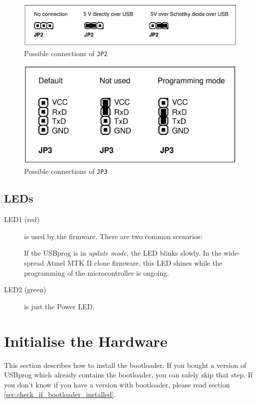 \documentclass[bibtotoc,UKenglish,halfparskip,oneside,DIV12]{scrreprt}
\begin{document}
\begin{figure}[thb]
  \centering
  \includegraphics{images/jp2}
  \caption{Possible connections of \texttt{JP2}}
  \label{fig:jp2}
\end{figure}

\begin{figure}[thb]
  \centering
  \includegraphics{images/jp3}
  \caption{Possible connections of \texttt{JP3}}
  \label{fig:jp3}
\end{figure}


\subsection{LEDs}
\label{sec:leds}

\begin{description}
  \item[LED1 (red)] is used by the firmware. There are two common scenarios:

    If the USBprog is in \emph{update mode,} the LED blinks slowly. In the wide-spread Atmel MTK II
    clone firmware, this LED shines while the programming of the microcontroller is ongoing.

  \item[LED2 (green)] is just the Power LED.
\end{description}


\section{Initialise the Hardware}
\label{sec:inithardware}

This section describes how to install the bootloader. If you bought a version of USBprog which
already contains the bootloader, you can safely skip that step. If you don't know if you have a
version with bootloader, please read section \vref{sec:check_if_bootloader_installed}.
\end{document}
